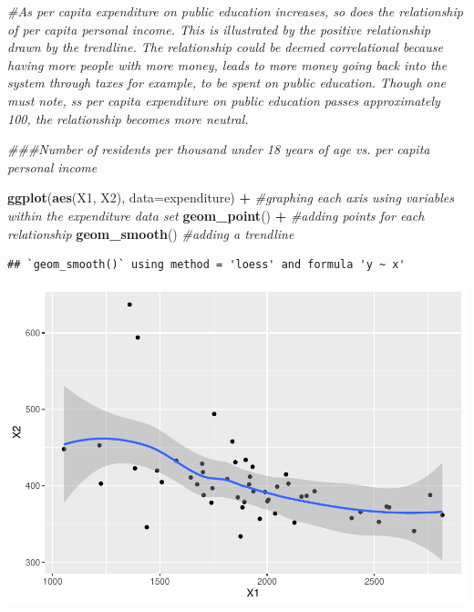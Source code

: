 \documentclass[]{article}
\newenvironment{Shaded}{\begin{snugshade}}{\end{snugshade}}
\newcommand{\CommentTok}[1]{\textcolor[rgb]{0.56,0.35,0.01}{\textit{#1}}}
\newcommand{\DataTypeTok}[1]{\textcolor[rgb]{0.13,0.29,0.53}{#1}}
\newcommand{\KeywordTok}[1]{\textcolor[rgb]{0.13,0.29,0.53}{\textbf{#1}}}
\newcommand{\NormalTok}[1]{#1}
\newcommand{\OperatorTok}[1]{\textcolor[rgb]{0.81,0.36,0.00}{\textbf{#1}}}
\newcommand{\StringTok}[1]{\textcolor[rgb]{0.31,0.60,0.02}{#1}}
\begin{document}
\begin{Shaded}
\begin{Highlighting}[]
\CommentTok{#As per capita expenditure on public education increases, so does the relationship of per capita personal income. This is illustrated by the positive relationship drawn by the trendline. The relationship could be deemed correlational because having more people with more money, leads to more money going back into the system through taxes for example, to be spent on public education. Though one must note, ss per capita expenditure on public education passes approximately 100, the relationship becomes more neutral.}

\CommentTok{###Number of residents per thousand under 18 years of age vs. per capita personal income}

\KeywordTok{ggplot}\NormalTok{(}\KeywordTok{aes}\NormalTok{(X1, X2), }\DataTypeTok{data=}\NormalTok{expenditure) }\OperatorTok{+}\StringTok{ }\CommentTok{#graphing each axis using variables within the expenditure data set}
\StringTok{  }\KeywordTok{geom_point}\NormalTok{() }\OperatorTok{+}\StringTok{ }\CommentTok{#adding points for each relationship}
\StringTok{  }\KeywordTok{geom_smooth}\NormalTok{() }\CommentTok{#adding a trendline}
\end{Highlighting}
\end{Shaded}

\begin{verbatim}
## `geom_smooth()` using method = 'loess' and formula 'y ~ x'
\end{verbatim}

\includegraphics{Problem-Set-Answers_files/figure-latex/unnamed-chunk-1-2.pdf}
\end{document}
